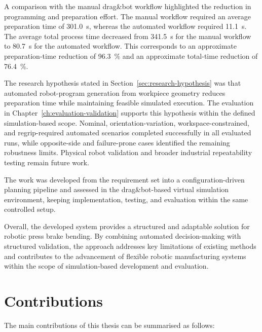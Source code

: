 A comparison with the manual drag\&bot workflow highlighted the reduction in programming and preparation effort. The manual workflow required an average preparation time of \SI{301.0}{\second}, whereas the automated workflow required \SI{11.1}{\second}. The average total process time decreased from \SI{341.5}{\second} for the manual workflow to \SI{80.7}{\second} for the automated workflow. This corresponds to an approximate preparation-time reduction of \SI{96.3}{\percent} and an approximate total-time reduction of \SI{76.4}{\percent}.

The research hypothesis stated in Section~\ref{sec:research-hypothesis} was that automated robot-program generation from workpiece geometry reduces preparation time while maintaining feasible simulated execution. The evaluation in Chapter~\ref{ch:evaluation-validation} supports this hypothesis within the defined simulation-based scope. Nominal, orientation-variation, workspace-constrained, and regrip-required automated scenarios completed successfully in all evaluated runs, while opposite-side and failure-prone cases identified the remaining robustness limits. Physical robot validation and broader industrial repeatability testing remain future work.

The work was developed from the requirement set into a configuration-driven planning pipeline and assessed in the drag\&bot-based virtual simulation environment, keeping implementation, testing, and evaluation within the same controlled setup.

Overall, the developed system provides a structured and adaptable solution for robotic press brake bending. By combining automated decision-making with structured validation, the approach addresses key limitations of existing methods and contributes to the advancement of flexible robotic manufacturing systems within the scope of simulation-based development and evaluation.

\section{Contributions}
\label{sec:thesis-contributions}

The main contributions of this thesis can be summarised as follows:

